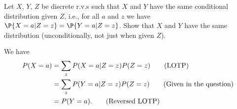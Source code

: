 
\setcounter{theorem}{7}
\begin{exercise}[BH.13]
	Let $X$, $Y$, $Z$ be discrete r.v.s such that $X$ and $Y$ have the same conditional distribution given $Z$, i.e., for all $a$ and $z$ we have $\P{X = a|Z = z} = \P{Y =a|Z = z}$. Show that $X$ and $Y$ have the same distribution (unconditionally, not just when given $Z$).
\begin{solution}
	We have
	\begin{align*}
		P(X=a)& = \sum_{z}P(X=a|Z=z)P(Z=z)\tag*{(\text{LOTP})}\\
		& =  \sum_{z}P(Y=a|Z=z)P(Z=z) \tag*{(\text{Given in the question})}\\
		& =  P(Y=a).\tag*{(\text{Reversed LOTP})}
	\end{align*}
\end{solution}
\end{exercise}


